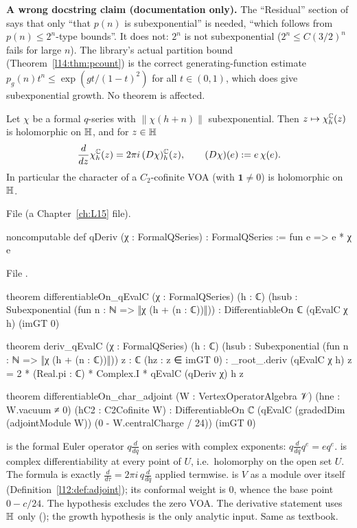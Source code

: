 \begin{warning}
\textbf{A wrong docstring claim (documentation only).} The ``Residual'' section of  says that only
``that $p(n)$ is subexponential'' is needed, ``which follows from $p(n)\le2^n$-type bounds''. It does not: $2^n$ is not
subexponential ($2^n\le C(3/2)^n$ fails for large $n$). The library's actual partition bound (Theorem~\ref{l14:thm:pcount})
is the correct generating-function estimate $p_g(n)t^n\le\exp(gt/(1-t)^2)$ for all $t\in(0,1)$, which does give
subexponential growth. No theorem is affected.
\end{warning}

\begin{theorem}\label{l14:thm:holo}
Let $\chi$ be a formal $q$-series with $\|\chi(h+n)\|$ subexponential. Then $z\mapsto\chi^{{\mathbb{C}}}_h(z)$ is holomorphic on
$\mathbb{H}$, and for $z\in\mathbb{H}$
\begin{equation*}
  \frac{d}{dz}\chi^{{\mathbb{C}}}_h(z) = 2\pi i\,(D\chi)^{{\mathbb{C}}}_h(z),\qquad (D\chi)(e) := e\,\chi(e).
\end{equation*}
In particular the character of a $C_2$-cofinite VOA (with $\mathbf 1\neq0$) is holomorphic on $\mathbb{H}$.
\end{theorem}
\noindent File  (a Chapter~\ref{ch:L15} file).
\begin{leancode}
noncomputable def qDeriv (χ : FormalQSeries) : FormalQSeries := fun e => e * χ e
\end{leancode}
\noindent File .
\begin{leancode}
theorem differentiableOn_qEvalC (χ : FormalQSeries) (h : ℂ)
    (hsub : Subexponential (fun n : ℕ => ‖χ (h + (n : ℂ))‖)) :
    DifferentiableOn ℂ (qEvalC χ h) (imGT 0)

theorem deriv_qEvalC (χ : FormalQSeries) (h : ℂ)
    (hsub : Subexponential (fun n : ℕ => ‖χ (h + (n : ℂ))‖)) {z : ℂ} (hz : z ∈ imGT 0) :
    _root_.deriv (qEvalC χ h) z = 2 * (Real.pi : ℂ) * Complex.I * qEvalC (qDeriv χ) h z

theorem differentiableOn_char_adjoint (W : VertexOperatorAlgebra 𝒱) (hne : W.vacuum ≠ 0)
    (hC2 : C2Cofinite W) :
    DifferentiableOn ℂ
      (qEvalC (gradedDim (adjointModule W)) (0 - W.centralCharge / 24)) (imGT 0)
\end{leancode}
\begin{dictionary}
 is the formal Euler operator $q\frac{d}{dq}$ on series with complex exponents: $q\frac{d}{dq}q^e = eq^e$.
 is complex differentiability at every point of $U$, i.e.\ holomorphy on the open set $U$.
The formula is exactly $\frac{d}{d\tau} = 2\pi i\,q\frac{d}{dq}$ applied termwise.  is $V$ as a module
over itself (Definition~\ref{l12:def:adjoint}); its conformal weight is $0$, whence the base point $0 - c/24$. The hypothesis
 excludes the zero VOA. The derivative statement uses $\mathbb{H}$ only (); the growth hypothesis is the
only analytic input. Same as textbook.
\end{dictionary}
